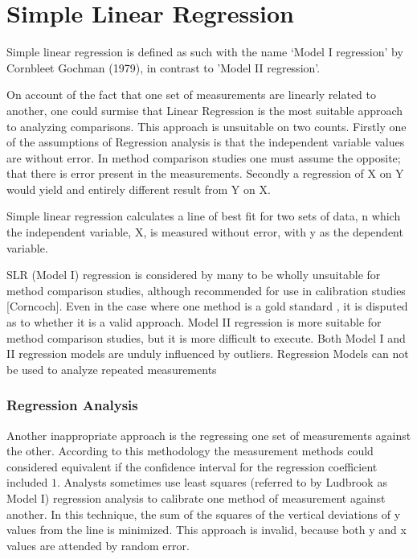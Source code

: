 \documentclass[12pt, a4paper]{report}
\theoremstyle{plain}
\theoremstyle{definition}
\theoremstyle{remark}
\begin{document}
\section{Simple Linear Regression}


Simple linear regression is defined as such with the name `Model I regression' by Cornbleet Gochman (1979), in contrast to 'Model II regression'.

On account of the fact that one set of measurements are linearly related to another, one could surmise that Linear Regression is the most suitable approach to analyzing comparisons. This approach is unsuitable on two counts. Firstly one of the assumptions of Regression analysis is that the independent variable values are without error. In method comparison studies one must assume the opposite; that there is error present in the measurements. Secondly a regression of X on Y would yield and entirely different result from Y on X.


Simple linear regression calculates a line of best fit for two
sets of data, n which the independent variable, X, is measured without error, with y as the dependent variable.  

SLR (Model I) regression is considered by many \citet{BA83,CornCoch,ludbrook97} to be wholly unsuitable for
method comparison studies, although recommended for use in calibration studies [Corncoch]. Even in the case where one
method is a gold standard , it is disputed as to whether it is a valid approach. Model II regression is more suitable for method comparison studies, but it is more difficult to execute. Both Model I and II regression models are unduly influenced by outliers. Regression Models can not be used to analyze repeated measurements

\subsubsection{Regression Analysis}
Another inappropriate approach is the regressing one set of measurements against the other. According to this methodology the measurement methods could considered equivalent if the confidence interval for
the regression coefficient included $1$. Analysts sometimes use least squares (referred to by Ludbrook as Model I) regression analysis to calibrate one method of measurement against another. In this technique, the sum of the squares of the vertical deviations of y values from the line is minimized. This approach is invalid, because both y and x values are attended by random error.
\end{document}
